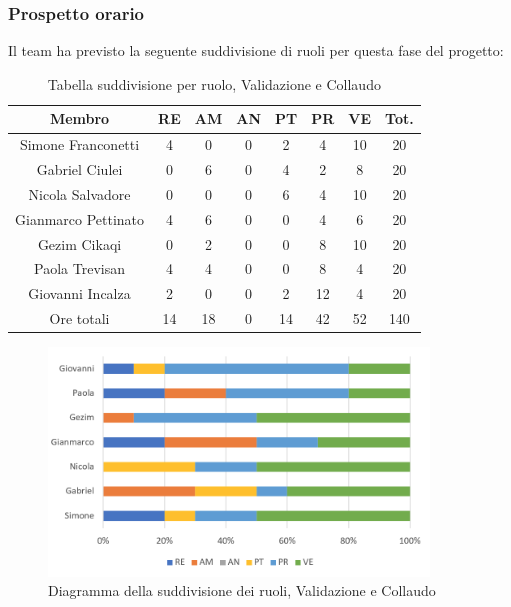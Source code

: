 \subsubsection{Prospetto orario}
Il team ha previsto la seguente suddivisione di ruoli per questa fase del progetto:
\begin{table}[h]
\caption{Tabella suddivisione per ruolo, Validazione e Collaudo}  
\begin{center}
\begin{tabular}{ |c|c|c|c|c|c|c|c|  }
 \hline
 Membro 		& RE 	& AM 	& AN 	& PT 	& PR 	& VE 	& Tot.\\
 \hline\hline
 Simone Franconetti			& 4 		& 0		& 0 	& 2 		& 4 		& 10 		& 20\\
 Gabriel Ciulei		& 0 		& 6 		& 0 	& 4		& 2 		& 8 		& 20\\
 Nicola	Salvadore		& 0 		& 0 		& 0 	& 6 		& 4 		& 10 		& 20\\
 Gianmarco Pettinato		& 4 		& 6 		& 0 	& 0	 	& 4 		& 6 		& 20\\
 Gezim Cikaqi			& 0 		& 2 		& 0 	& 0 		& 8 		& 10	 	& 20\\
 Paola Trevisan			& 4 		& 4 		& 0 	& 0 		& 8 		& 4 		& 20\\
 Giovanni Incalza		& 2 		& 0	 	& 0 	& 2 		& 12 	& 4  	& 20\\
 \hline\hline
 Ore totali		& 14		& 18		& 0 	& 14	 	& 42 	& 52 	& 140\\
  \hline
\end{tabular}
\end{center}
\end{table}
\begin{figure}[h!]
	\centering
	\includegraphics[width=0.9\textwidth]{res/img/hi5}
	\caption{Diagramma della suddivisione dei ruoli, Validazione e Collaudo}
\end{figure}

